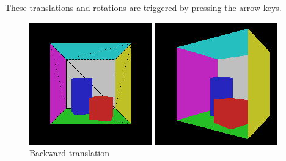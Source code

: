 These translations and rotations are triggered by pressing the arrow keys.

\begin{figure}[H]
    \centering
    \includegraphics[width=\linewidth]{img/backward.jpg}
    \caption{Backward translation}
\endminipage\hfill
{}
    \centering
    \includegraphics[width=\linewidth]{img/right.jpg}

\end{figure}
